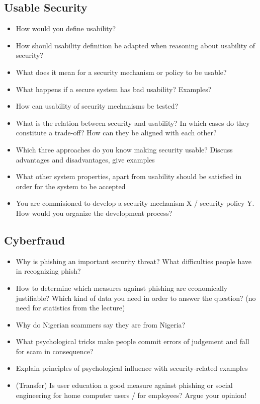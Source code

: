 \subsection{Usable Security}
\begin{itemize}
	\item
		How would you define usability?
	\item
		How should usability definition be adapted when reasoning about usability of security?
	\item
		What does it mean for a security mechanism or policy to be usable?
	\item
		What happens if a secure system has bad usability? Examples?
	\item
		How can usability of security mechanisms be tested?
	\item
		What is the relation between security and usability? In which cases do they constitute a trade-off? How can they be aligned with each other?
	\item
		Which three approaches do you know making security usable? Discuss advantages and disadvantages, give examples
	\item
		What other system properties, apart from usability should be satisfied in order for the system to be accepted
	\item
		You are commisioned to develop a security mechanism X / security policy Y. How would you organize the development process?
\end{itemize}

\subsection{Cyberfraud}
\begin{itemize}
	\item
		Why is phishing an important security threat? What difficulties people have in recognizing phish?
	\item
		How to determine which measures against phishing are economically justifiable? Which kind of data you need in order to answer the question? (no need for statistics from the lecture)
	\item
		Why do Nigerian scammers say they are from Nigeria?
	\item
		What psychological tricks make people commit errors of judgement and fall for scam in consequence?
	\item
		Explain principles of psychological influence with security-related examples
	\item
		(Transfer) Is user education a good measure against phishing or social engineering for home computer users / for employees? Argue your opinion!
\end{itemize}
